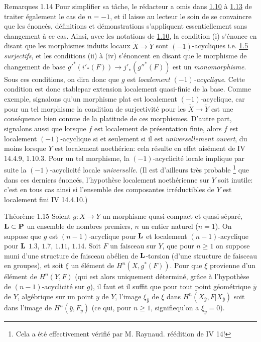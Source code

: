 \documentclass[10pt]{../fichiers-configuration-latex/smfart}
\begin{document}
\begin{enonce*}[remark]{Remarques 1.14}
Pour simplifier sa tâche, le rédacteur a omis dans \hyperref[XV.prop1.10]{1.10} 
à \hyperref[XV.prop1.13]{1.13} de
traiter également le cas de $n=-1$, et il laisse au lecteur le soin de
se convaincre que les énoncés, définitions et démonstrations
s'appliquent essentiellement sans changement à ce cas. Ainsi, avec les
notations de \hyperref[XV.prop1.10]{1.10}, la condition (i) s'énonce en disant que les
morphismes induits locaux $\widetilde{X}\rightarrow \widetilde{Y}$
sont $(-1)$-acycliques i.e. \hyperref[XV.cor1.5]{1.5} \emph{surjectifs}, et les conditions (ii)
à (iv) s'énoncent en disant que le morphisme de changement de base
${g'}^{\ast}({i'}_{\ast}(F))\rightarrow {j'}_{\ast}({g''}^{\ast}(F))$
est un \emph{monomorphisme}. Sous ces conditions, on dira donc que $g$
est \emph{localement $(-1)$-acyclique}. Cette condition est donc
stable\pageoriginale par extension localement quasi-finie de la
base. Comme exemple, signalons qu'un morphisme plat est localement
$(-1)$-acyclique, car pour un tel morphisme la condition de
surjectivité pour les $\widetilde{X}\rightarrow \widetilde{Y}$ est une
conséquence bien connue de la platitude de ces morphismes. D'autre
part, signalons aussi que lorsque $f$ est localement de présentation
finie, alors $f$ est localement $(-1)$-acyclique si et seulement si il
est \emph{universellement ouvert}, du moins lorsque $Y$ est localement
noethérien: cela résulte en effet aisément de \EGA IV 14.4.9,
1.10.3. Pour un tel morphisme, la $(-1)$-acyclicité locale implique
par suite la $(-1)$-acyclicité locale \emph{universelle}. (Il est
d'ailleurs très probable \footnote[1]{Cela a été effectivement vérifié
par M. Raynaud. \Cf réédition de \EGA IV 14!} que dans ces derniers
énoncés, l'hypothèse localement noethérienne sur $Y$ soit inutile:
c'est en tous cas ainsi si l'ensemble des composantes irréductibles de
$Y$ est localement fini \EGA IV 14.4.10.)
\end{enonce*}

\begin{enonce*}{Théorème 1.15}
Soient $g:X\rightarrow Y$ un morphisme quasi-compact et quasi-séparé,
$\mathbf{L}\subset \mathbf{P}$ un ensemble de nombres premiers, $n$ un
entier naturel (\resp $n=1$). On suppose que $g$ est $(n-1)$-acyclique
pour $\mathbf{L}$ et localement $(n-1)$-acyclique pour $\mathbf{L}$
$1.3$, $1.7$, $1.11$, $1.14$. Soit $F$ un faisceau sur $Y$, que pour
$n\geq 1$ on suppose muni d'une structure de faisceau abélien de
$\mathbf{L}$-torsion (\resp d'une structure de faisceau en groupes),
et soit $\xi$ un élément de $H^{n}(X,g^{\ast}(F))$. Pour que $\xi$
provienne d'un élément de $H^{n}(Y,F)$ (qui est alors uniquement
déterminé, grâce à l'hypothèse de $(n-1)$-acyclicité sur $g$), il faut
et il suffit que pour tout point géométrique $\bar{y}$ de $Y$,
algébrique sur un point $y$ de $Y$, l'image $\xi_{\bar{y}}$ de $\xi$
dans $H^{n}(X_{\bar{y}},F|X_{\bar{y}})$ soit dans l'image de
$H^{n}(\bar{y},F_{\bar{y}})$ (ce qui, pour $n\geq 1$,
signifie\pageoriginale qu'on a $\xi_{\bar{y}}=0$).
\end{enonce*}
\end{document}
